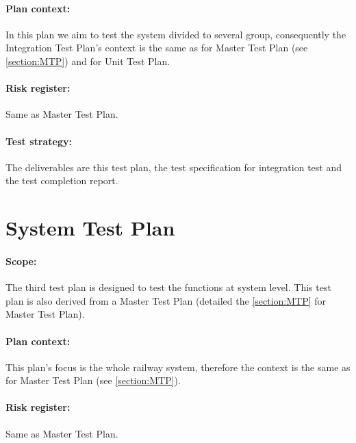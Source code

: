 \paragraph{Plan context:} In this plan we aim to test the system divided to several group, consequently the Integration Test Plan's context is the same as for Master Test Plan (see \autoref{section:MTP}) and for Unit Test Plan.
\paragraph{Risk register:} Same as Master Test Plan.
\paragraph{Test strategy:} The deliverables are this test plan, the test specification for integration test and the test completion report. 


\section{System Test Plan}
\paragraph{Scope:} The third test plan is designed to test the functions at system level. This test plan is also derived from a Master Test Plan (detailed the \autoref{section:MTP} for Master Test Plan).
\paragraph{Plan context:} This plan's focus is the whole railway system, therefore the context is the same as for Master Test Plan (see \autoref{section:MTP}).
\paragraph{Risk register:} Same as Master Test Plan.
